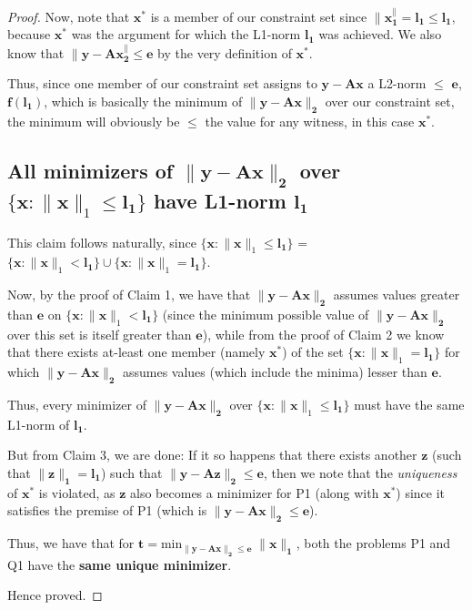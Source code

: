\documentclass[a4paper,11pt]{article}
\numberwithin{definition}{section}
\numberwithin{mytheorem}{subsection}
\begin{document}
\begin{proof}
Now, note that $\boldsymbol{x^*}$ is a member of our constraint set since $\boldsymbol{\lVert x^\rVert_1 = l_1 \leq l_1}$, because $\boldsymbol{x^*}$ was the argument for which the L1-norm $\boldsymbol{l_1}$ was achieved. We also know that $\boldsymbol{\lVert y - Ax^\rVert_2 \leq e}$ by the very definition of $\boldsymbol{x^*}$. 

Thus, since one member of our constraint set assigns to $\boldsymbol{y-Ax}$ a L2-norm $\leq$ $\boldsymbol{e}$, $\boldsymbol{f(l_1)}$, which is basically the minimum of $\boldsymbol{\lVert y - Ax\rVert_2}$ over our constraint set, the minimum will obviously be $\leq$ the value for any witness, in this case $\boldsymbol{x^*}$.

\subsection{All minimizers of $\boldsymbol{\lVert y - Ax\rVert_2}$ over $\{\boldsymbol{x}: \lVert\boldsymbol{x}\rVert_1 \leq \boldsymbol{l_1}\}$ have L1-norm $\boldsymbol{l_1}$}

This claim follows naturally, since $\{\boldsymbol{x}: \lVert\boldsymbol{x}\rVert_1 \leq \boldsymbol{l_1}\}$ = $\{\boldsymbol{x}: \lVert\boldsymbol{x}\rVert_1 < \boldsymbol{l_1}\}\cup\{\boldsymbol{x}: \lVert\boldsymbol{x}\rVert_1 = \boldsymbol{l_1}\}$. 

Now, by the proof of Claim 1, we have that $\boldsymbol{\lVert y - Ax\rVert_2}$ assumes values greater than $\boldsymbol{e}$ on $\{\boldsymbol{x}: \lVert\boldsymbol{x}\rVert_1 < \boldsymbol{l_1}\}$ (since the minimum possible value of $\boldsymbol{\lVert y - Ax\rVert_2}$ over this set is itself greater than $\boldsymbol{e}$), while from the proof of Claim 2 we know that there exists at-least one member (namely $\boldsymbol{x^*}$) of the set $\{\boldsymbol{x}: \lVert\boldsymbol{x}\rVert_1 = \boldsymbol{l_1}\}$ for which $\boldsymbol{\lVert y - Ax\rVert_2}$ assumes values (which include the minima) lesser than $\boldsymbol{e}$. 

Thus, every minimizer of $\boldsymbol{\lVert y - Ax\rVert_2}$ over $\{\boldsymbol{x}: \lVert\boldsymbol{x}\rVert_1 \leq \boldsymbol{l_1}\}$ must have the same L1-norm of $\boldsymbol{l_1}$.


But from Claim 3, we are done: If it so happens that there exists another $\boldsymbol{z}$ (such that $\boldsymbol{\lVert z\rVert_1 = l_1}$) such that $\boldsymbol{\lVert y - Az\rVert_2 \leq e}$, then we note that the \emph{uniqueness} of $\boldsymbol{x^*}$ is violated, as $\boldsymbol{z}$ also becomes a minimizer for P1 (along with $\boldsymbol{x^*}$) since it satisfies the premise of P1 (which is $\boldsymbol{\lVert y - Ax\rVert_2 \leq e}$).

Thus, we have that for $\boldsymbol{t = \mathrm{min}_{\lVert y - Ax\rVert_2 \leq e}\;\lVert x\rVert_1}$, both the problems P1 and Q1 have the \textbf{same unique minimizer}.

Hence proved.
\end{proof}
\end{document}
